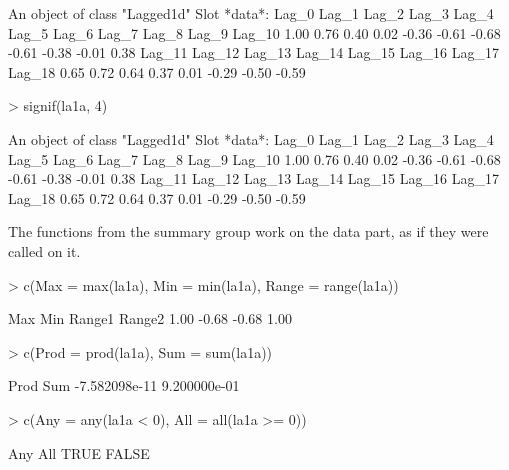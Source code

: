 \documentclass[a4paper,twoside,11pt,nojss,article]{jss}
\begin{document}
\begin{Schunk}
\begin{Soutput}
An object of class "Lagged1d"
Slot *data*: 
 Lag_0  Lag_1  Lag_2  Lag_3  Lag_4  Lag_5  Lag_6  Lag_7  Lag_8  Lag_9 Lag_10 
  1.00   0.76   0.40   0.02  -0.36  -0.61  -0.68  -0.61  -0.38  -0.01   0.38 
Lag_11 Lag_12 Lag_13 Lag_14 Lag_15 Lag_16 Lag_17 Lag_18 
  0.65   0.72   0.64   0.37   0.01  -0.29  -0.50  -0.59 
\end{Soutput}
\begin{Sinput}
> signif(la1a, 4)
\end{Sinput}
\begin{Soutput}
An object of class "Lagged1d"
Slot *data*: 
 Lag_0  Lag_1  Lag_2  Lag_3  Lag_4  Lag_5  Lag_6  Lag_7  Lag_8  Lag_9 Lag_10 
  1.00   0.76   0.40   0.02  -0.36  -0.61  -0.68  -0.61  -0.38  -0.01   0.38 
Lag_11 Lag_12 Lag_13 Lag_14 Lag_15 Lag_16 Lag_17 Lag_18 
  0.65   0.72   0.64   0.37   0.01  -0.29  -0.50  -0.59 
\end{Soutput}
\end{Schunk}

The functions from the summary group work on the data part, as if they were called on it.
\begin{Schunk}
\begin{Sinput}
> c(Max = max(la1a), Min = min(la1a), Range = range(la1a))
\end{Sinput}
\begin{Soutput}
   Max    Min Range1 Range2 
  1.00  -0.68  -0.68   1.00 
\end{Soutput}
\begin{Sinput}
> c(Prod = prod(la1a), Sum = sum(la1a))
\end{Sinput}
\begin{Soutput}
         Prod           Sum 
-7.582098e-11  9.200000e-01 
\end{Soutput}
\begin{Sinput}
> c(Any = any(la1a < 0), All = all(la1a >= 0))
\end{Sinput}
\begin{Soutput}
  Any   All 
 TRUE FALSE 
\end{Soutput}
\end{Schunk}
\end{document}
